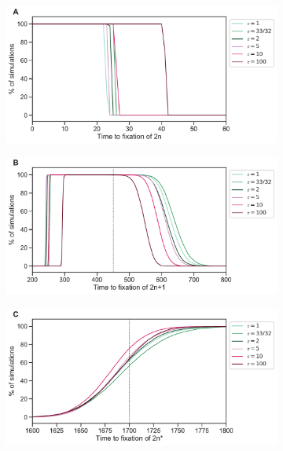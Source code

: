 \documentclass[12pt]{extarticle}
\begin{document}
\begin{figure}[p!]
  \centering
  \begin{subfigure}{0.75\textwidth}
      \includegraphics[width=\textwidth]{../figures/tau-diff-a.pdf}      
  \end{subfigure}
  \begin{subfigure}{0.75\textwidth}
      \includegraphics[width=\textwidth]{../figures/tau-diff-b.pdf}      
  \end{subfigure}
   \begin{subfigure}{0.75\textwidth}
      \includegraphics[width=\textwidth]{../figures/tau-diff-c.pdf}      

\end{subfigure}
\end{figure}
\end{document}
